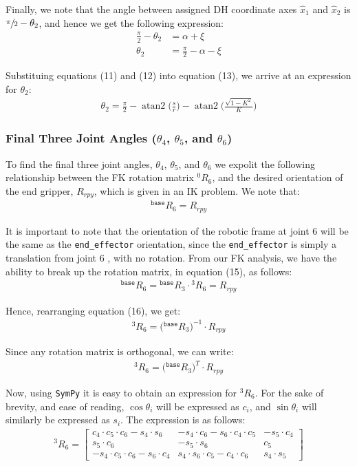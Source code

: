 \documentclass[a4paper]{article}
\DeclareMathOperator{\atantwo}{atan2}
\begin{document}
Finally, we note that the angle between assigned DH coordinate axes $\hat{x}_1$ and $\hat{x}_2$ is $\sfrac{\pi}{2} - \theta_2$, and hence we get the following expression:
\begin{align}
\frac{\pi}{2} - \theta_2 &= \alpha + \xi \nonumber\\
\theta_2 &= \frac{\pi}{2} - \alpha - \xi
\end{align}

Substituing equations (11) and (12) into equation (13), we arrive at an expression for $\theta_2$:
\begin{align}
\theta_2 = \frac{\pi}{2} - \atantwo \bigg(\frac{s}{r}\bigg) - \atantwo \bigg(\frac{\sqrt{1 - K^2}}{K}\bigg)
\end{align}

\subsubsection{Final Three Joint Angles ($\theta_4$, $\theta_5$, and $\theta_6$)}
To find the final three joint angles, $\theta_4$, $\theta_5$, and $\theta_6$ we expolit the following relationship between the FK rotation matrix $^0 R_6$, and the desired orientation of the end gripper, $R_{rpy}$, which is given in an IK problem. We note that:
\begin{align}
^\texttt{base} R_6 = R_{rpy}
\end{align}

It is important to note that the orientation of the robotic frame at joint 6 will be the same as the \verb|end_effector| orientation, since the \verb|end_effector| is simply a translation from joint 6 , with no rotation. From our FK analysis, we have the ability to break up the rotation matrix, in equation (15), as follows:
\begin{align}
^\texttt{base} R_6 = {}^{\texttt{base}}R_3 \cdot {}^{3}R_6 = R_{rpy}
\end{align}

Hence, rearranging equation (16), we get:
\begin{align*}
^3 R_6 = \big({}^{\texttt{base}}R_3\big)^{-1} \cdot R_{rpy}
\end{align*}

Since any rotation matrix is orthogonal, we can write:
\begin{align}
^3 R_6 = \big({}^{\texttt{base}}R_3\big)^{T} \cdot R_{rpy}
\end{align}

Now, using \verb|SymPy| it is easy to obtain an expression for $^3 R_6$. For the sake of brevity, and ease of reading, $\cos \theta_i$ will be expressed as $c_i$, and $\sin \theta_i$ will similarly be expressed as $s_i$. The expression is as follows:
\begin{align}
^3 R_6 =
\begin{bmatrix}
c_4 \cdot c_5 \cdot c_6 - s_4 \cdot s_6 & -s_4 \cdot c_6 - s_6 \cdot c_4 \cdot c_5 & -s_5 \cdot c_4\\
s_5 \cdot c_6 & -s_5 \cdot s_6 & c_5\\
-s_4 \cdot c_5 \cdot c_6 - s_6 \cdot c_4 & s_4 \cdot s_6 \cdot c_5 - c_4 \cdot c_6 & s_4 \cdot s_5
\end{bmatrix}
\end{align}
\end{document}
